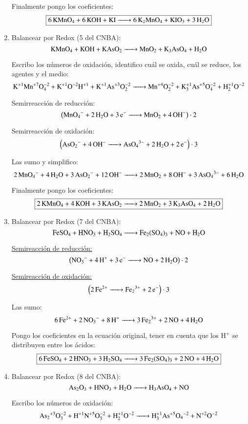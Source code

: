 \begin{enumerate}
Finalmente pongo los coeficientes:
$$\fbox{\ce{
6KMnO4 + 6KOH + KI ->
6K2MnO4 + KIO3 + 3H2O
}}$$


\item
Balancear por Redox (5 del CNBA):
$$\ce{
KMnO4 + KOH + KAsO2 ->
MnO2 + K3AsO4 + H2O
}$$

Escribo los números de oxidación, identifico cuál se oxida, cuál se reduce, los agentes y el medio:
\[\ce{
K^{+1}Mn^{+7}O^{-2}4 + K^{+1}O^{-2}H^{+1} + K^{+1}As^{+3}O^{-2}2 ->
Mn^{+4}O^{-2}2 + K^{+1}3As^{+5}O^{-2}4 + H^{+1}2O^{-2}
}\]


\begin{multicols}{2}
Semirreacción de reducción:
$$\left(\ce{
MnO4^- + 2H2O + 3e^- ->
MnO2 + 4OH^-
}\right)\cdot 2$$

Semirreacción de oxidación:
$$\left(\ce{
AsO2^- + 4OH^- ->
AsO_4^{3-} + 2H2O + 2e^-
}\right)\cdot 3$$
\end{multicols}

Las sumo y simplifico:
$$\ce{
2MnO4^- + 4 H2O + 3AsO2^- + 12 OH^- ->
2MnO2 + 8OH^- + 3 AsO4^{3-} + 6H2O
}$$

Finalmente pongo los coeficientes:
$$\fbox{\ce{
2KMnO4 + 4KOH + 3KAsO2 ->
2MnO2 + 3K3AsO4 + 2H2O
}}$$


\newpage
\item Balancear por Redox (7 del CNBA):
$$\ce{FeSO_4 + HNO_3 + H_2SO_4 -> Fe_2(SO4)3 + NO + H2O}$$

\begin{multicols}{2}
\underline{Semireacción de reducción:}
 $$\left(\ce{NO_3^- + 4H^+ + 3e^- -> NO + 2H_2O}\right)\cdot 2$$

\underline{Semireacción de oxidación:}
$$\left(\ce{ 2Fe^{2+} -> Fe_2^{3+} + 2e^-}  \right)\cdot 3$$
\end{multicols}

Las sumo:
$$
\ce{6Fe^{2+} + 2NO_3^- + 8H^+ -> 3Fe_2^{3+} + 2NO + 4H_2O}
$$

Pongo los coeficientes en la ecuación original, tener en cuenta que los H$^+$ se distribuyen entre los ácidos:
$$\fbox{\ce{6FeSO_4 + 2HNO_3 + 3H_2SO_4 -> 3Fe_2(SO4)3 + 2NO + 4H2O}}$$


\item Balancear por Redox (8 del CNBA):
$$\ce{
As2O3 + HNO3 + H2O -> H3AsO4 + NO
}$$

Escribo los números de oxidación:
$$\ce{
As2^{+3}O^{-2}3 + H^{+1}N^{+5}O^{-2}3 + H^{+1}2O^{-2} -> H^{+1}3As^{+5}O4^{-2} + N^{+2}O^{-2}
}$$


\end{enumerate}
